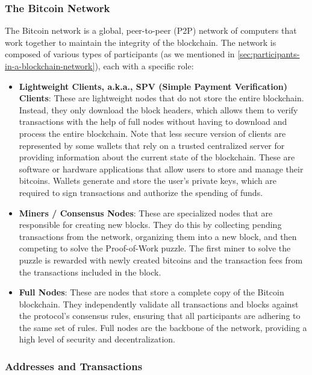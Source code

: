 \subsubsection{The Bitcoin Network}\label{the-bitcoin-network}

The Bitcoin network is a global, peer-to-peer (P2P) network of computers
that work together to maintain the integrity of the blockchain. The
network is composed of various types of participants (as we mentioned in \autoref{sec:participants-in-a-blockchain-network}), each with a
specific role:

\begin{itemize}
	\tightlist
	\item
	\textbf{Lightweight Clients, a.k.a., SPV (Simple Payment Verification) Clients}: These are
	lightweight nodes that do not store the entire blockchain. Instead,
	they only download the block headers, which allows them to verify
	transactions with the help of full nodes without having to download
	and process the entire blockchain.
	Note that less secure version of clients are represented by some wallets that rely on a trusted centralized server for providing information about the current state of the blockchain. 
	These are software or hardware
	applications that allow users to store and manage their bitcoins.
	Wallets generate and store the user's private keys, which are required
	to sign transactions and authorize the spending of funds.
	\item
	\textbf{Miners / Consensus Nodes}: These are specialized nodes that are responsible for
	creating new blocks. They do this by collecting pending transactions
	from the network, organizing them into a new block, and then competing
	to solve the Proof-of-Work puzzle. The first miner to solve the puzzle
	is rewarded with newly created bitcoins and the transaction fees from
	the transactions included in the block.
	\item
	\textbf{Full Nodes}: These are nodes that store a complete copy of the
	Bitcoin blockchain. They independently validate all transactions and
	blocks against the protocol's consensus rules, ensuring that all
	participants are adhering to the same set of rules. Full nodes are the
	backbone of the network, providing a high level of security and
	decentralization.


\end{itemize}

\subsubsection{Addresses and
	Transactions}\label{addresses-and-transactions}

